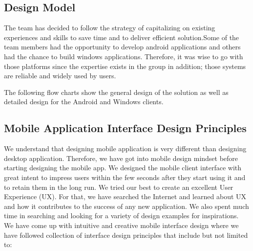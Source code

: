 \documentclass{article}
\begin{document}
\subsection{Design Model}
The team has decided to follow the strategy of capitalizing on existing experiences and skills to save time and to deliver efficient solution.Some of the team members had the opportunity to develop android applications and others had the chance to build windows applications. Therefore, it was wise to go with those platforms since the expertise exists in the group in addition; those systems are reliable and widely used by users.

The following flow charts show the general design of the solution as well as detailed design for the Android and Windows clients.


\subsection{Mobile Application Interface Design Principles}
We understand that designing mobile application is very different than designing desktop application.
Therefore, we have got into mobile design mindset before starting designing the mobile app.
We designed the mobile client interface with great intent to impress users within the few seconds after they start using it and to retain them in the long run. We tried our best to create an excellent User Experience (UX). For that, we have searched the Internet and learned about UX and how it contributes to the success of any new application. We also spent much time in searching and looking for a variety of design examples for inspirations. We have come up with intuitive and creative mobile interface design where we have followed collection of interface design principles that include but not limited to:
\end{document}
